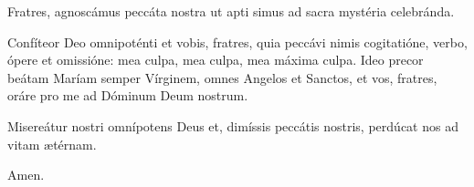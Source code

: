 \Vbardot{} Fratres, agnoscámus peccáta nostra ut apti simus ad sacra mystéria celebránda.

Confíteor Deo omnipoténti et vobis, fratres, quia peccávi nimis cogitatióne, verbo, ópere et omissióne: 
mea culpa, mea culpa, mea máxima culpa. 
Ideo precor beátam Maríam semper Vírginem, 
omnes Angelos et Sanctos, et vos, fratres, 
oráre pro me ad Dóminum Deum nostrum.

\Vbardot{} Misereátur nostri omnípotens Deus et, dimíssis peccátis nostris, perdúcat nos ad vitam ætérnam.

\Rbardot{} Amen.
